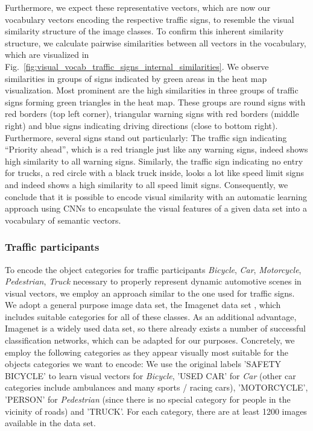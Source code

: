 Furthermore, we expect these representative vectors, which are now our vocabulary vectors encoding the respective traffic signs, to resemble the visual similarity structure of the image classes. 
To confirm this inherent similarity structure, we calculate pairwise similarities between all vectors in the vocabulary, which are visualized in Fig.~\ref{fig:visual_vocab_traffic_signs_internal_similarities}.
We observe similarities in groups of signs indicated by green areas in the heat map visualization.
Most prominent are the high similarities in three groups of traffic signs forming green triangles in the heat map.
These groups are round signs with red borders (top left corner), triangular warning signs with red borders (middle right) and blue signs indicating driving directions (close to bottom right).
Furthermore, several signs stand out particularly: The traffic sign indicating \enquote{Priority ahead}, which is a red triangle just like any warning signs, indeed shows high similarity to all warning signs.
Similarly, the traffic sign indicating no entry for trucks, a red circle with a black truck inside, looks a lot like speed limit signs and indeed shows a high similarity to all speed limit signs.
Consequently, we conclude that it is possible to encode visual similarity with an automatic learning approach using \acp{CNN} to encapsulate the visual features of a given data set into a vocabulary of semantic vectors.

\subsubsection{Traffic participants}%
\label{ssubsec:traffic_participants}

To encode the object categories for traffic participants \emph{Bicycle}, \emph{Car}, \emph{Motorcycle}, \emph{Pedestrian}, \emph{Truck} necessary to properly represent dynamic automotive scenes in visual vectors, we employ an approach similar to the one used for traffic signs.
We adopt a general purpose image data set, the Imagenet data set \parencite{Deng2009}, which includes suitable categories for all of these classes.
As an additional advantage, Imagenet is a widely used data set, so there already exists a number of successful classification networks, which can be adapted for our purposes.
Concretely, we employ the following categories as they appear visually most suitable for the objects categories we want to encode:
We use the original labels 'SAFETY BICYCLE' to learn visual vectors for \emph{Bicycle}, 'USED CAR' for \emph{Car} (other car categories include ambulances and many sports / racing cars), 'MOTORCYCLE', 'PERSON' for \emph{Pedestrian} (since there is no special category for people in the vicinity of roads) and 'TRUCK'.
For each category, there are at least \num{1200} images available in the data set.


